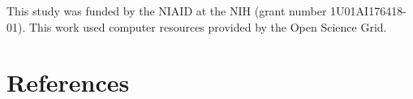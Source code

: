 This study was funded by the NIAID at the NIH (grant number 1U01AI176418-01). This work used computer resources provided by the Open Science Grid.

\section{References}\label{references}



\address{%
Erik S. Wright\\
University of Pittsburgh\\%
Department of Biomedical Informatics\\ Pittsburgh, PA, USA\\
%
%
\textit{ORCiD: \href{https://orcid.org/0000-0002-1457-4019}{0000-0002-1457-4019}}\\%
\href{mailto:eswright@pitt.edu}{\nolinkurl{eswright@pitt.edu}}%
}
